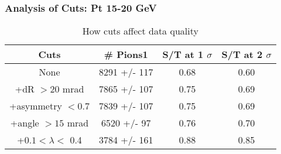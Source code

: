 \frame
{
\frametitle{Analysis of Cuts: Pt 15-20 GeV}
\begin{table}
\caption{How cuts affect data quality}
\centering
\begin{tabular}{c c c c}
\hline\hline
Cuts & \# Pions1 & S/T at 1 $\sigma$ & S/T at 2 $\sigma$ \\ [0.5ex]
\hline
None & 8291 +/-  117 & 0.68 & 0.60 \\ %
+dR $> 20$ mrad & 7865 +/-  107 & 0.75 & 0.69 \\ %
+asymmetry $< 0.7$ & 7839 +/-  107 & 0.75 & 0.69 \\ %
+angle $> 15$ mrad & 6520 +/-   97 & 0.76 & 0.70 \\ %
+$0.1 < \lambda <$ 0.4 & 3784 +/-  161 & 0.88 & 0.85 \\ %
[1ex]
\hline
\end{tabular}
\label{table:nonlin}
\end{table}
}
